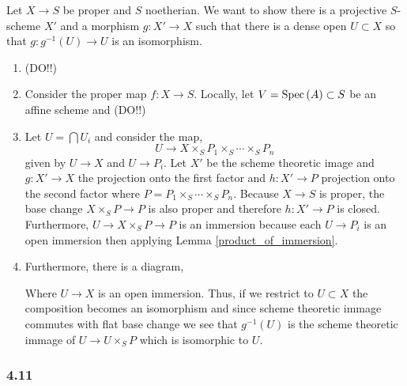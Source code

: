 \documentclass[12pt]{article}
\begin{document}
Let $X \to S$ be proper and $S$ noetherian. We want to show there is a projective $S$-scheme $X'$ and a morphism $g : X' \to X$ such that there is a dense open $U \subset X$ so that $g : g^{-1}(U) \to U$ is an isomorphism.

\begin{enumerate}
\item (DO!!)

\item Consider the proper map $f : X \to S$. Locally, let $V = \mathrm{Spec}\left( A \right) \subset S$ be an affine scheme and (DO!!)

\item Let $U = \bigcap U_i$ and consider the map,
\[ U \to X \times_S P_1 \times_S \cdots \times_S P_n \]
given by $U \to X$ and $U \to P_i$. Let $X'$ be the scheme theoretic image and $g : X' \to X$ the projection onto the first factor and $h : X' \to P$ projection onto the second factor where $P = P_1 \times_S \cdots \times_S P_n$. Because $X \to S$ is proper, the base change $X \times_S P \to P$ is also proper and therefore $h : X' \to P$ is closed. Furthermore, $U \to X \times_S P \to P$ is an immersion because each $U \to P_i$ is an open immersion then applying Lemma \ref{product_of_immersion}.  

\item Furthermore, there is a diagram,
\begin{center}
\end{center}
Where $U \to X$ is an open immersion. Thus, if we restrict to $U \subset X$ the composition becomes an isomorphism and since scheme theoretic immage commutes with flat base change we see that $g^{-1}(U)$ is the scheme theoretic immage of $U \to U \times_S P$ which is isomorphic to $U$. 
\end{enumerate}

\subsubsection{4.11}

\renewcommand{\O}{\mathcal{O}}
\end{document}
